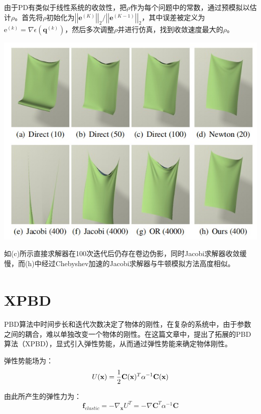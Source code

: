 \documentclass{CLGPY}
\begin{document}
\begin{multicols}{2}
		由于PD有类似于线性系统的收敛性，把$\rho$作为每个问题中的常数，通过预模拟以估计$\rho$。首先将$\rho$初始化为$\left|\left|\mathbf{e}^{(K)}\right|\right|_{2}/\left|\left|\mathbf{e}^{(K-1)}\right|\right|_{2}$，其中误差被定义为$\mathrm{e}^{(k)}=\nabla\epsilon(\mathbf{q}^{(k)})$，然后多次调整$\rho$并进行仿真，找到收敛速度最大的$\rho$。
        \begin{center}
            \includegraphics[width=1.0\linewidth]{./fig/Chebyshev加速对比.jpg}
        \end{center}

		如(c)所示直接求解器在100次迭代后仍存在卷边伪影，同时Jacobi求解器收敛缓慢，而(h)中经过Chebyshev加速的Jacobi求解器与牛顿模拟方法高度相似。

		\section{XPBD\textsuperscript{\cite{5}}}

		PBD算法中时间步长和迭代次数决定了物体的刚性，在复杂的系统中，由于参数之间的耦合，难以单独改变一个物体的刚性。在这篇文章中，提出了拓展的PBD算法（XPBD），显式引入弹性势能，从而通过弹性势能来确定物体刚性。

		弹性势能场为：
       \begin{equation}
			U({\bf x})={\frac{1}{2}}{\bf C}({\bf x})^{T}\alpha^{-1}{\bf C}({\bf x})
		\end{equation}

		由此所产生的弹性力为：
       \begin{equation}
			\mathbf{f}_{e l a s t i c}=-\nabla_{\mathbf{x}}U^{T}=-\nabla\mathbf{C}^{T}\alpha^{-1}\mathbf{C}
		\end{equation}


\end{multicols}
\end{document}
